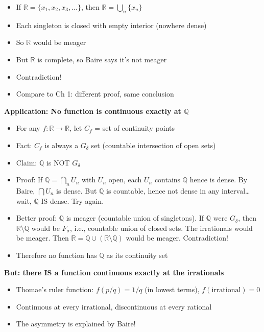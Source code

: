 \documentclass[
  10pt,
  letterpaper,
]{scrbook}
\providecommand{\tightlist}{%
  \setlength{\itemsep}{0pt}\setlength{\parskip}{0pt}}
\begin{document}
\begin{itemize}
\tightlist
\item
  If \(\mathbb{R} = \{x_1, x_2, x_3, \ldots\}\), then
  \(\mathbb{R} = \bigcup_n \{x_n\}\)
\item
  Each singleton is closed with empty interior (nowhere dense)
\item
  So \(\mathbb{R}\) would be meager
\item
  But \(\mathbb{R}\) is complete, so Baire says it's not meager
\item
  Contradiction!
\item
  Compare to Ch 1: different proof, same conclusion
\end{itemize}

\textbf{Application: No function is continuous exactly at
\(\mathbb{Q}\)}

\begin{itemize}
\tightlist
\item
  For any \(f: \mathbb{R} \to \mathbb{R}\), let \(C_f\) = set of
  continuity points
\item
  Fact: \(C_f\) is always a \(G_\delta\) set (countable intersection of
  open sets)
\item
  Claim: \(\mathbb{Q}\) is NOT \(G_\delta\)
\item
  Proof: If \(\mathbb{Q} = \bigcap_n U_n\) with \(U_n\) open, each
  \(U_n\) contains \(\mathbb{Q}\) hence is dense. By Baire,
  \(\bigcap U_n\) is dense. But \(\mathbb{Q}\) is countable, hence not
  dense in any interval\ldots{} wait, \(\mathbb{Q}\) IS dense. Try
  again.
\item
  Better proof: \(\mathbb{Q}\) is meager (countable union of
  singletons). If \(\mathbb{Q}\) were \(G_\delta\), then
  \(\mathbb{R} \setminus \mathbb{Q}\) would be \(F_\sigma\), i.e.,
  countable union of closed sets. The irrationals would be meager. Then
  \(\mathbb{R} = \mathbb{Q} \cup (\mathbb{R} \setminus \mathbb{Q})\)
  would be meager. Contradiction!
\item
  Therefore no function has \(\mathbb{Q}\) as its continuity set
\end{itemize}

\textbf{But: there IS a function continuous exactly at the irrationals}

\begin{itemize}
\tightlist
\item
  Thomae's ruler function: \(f(p/q) = 1/q\) (in lowest terms),
  \(f(\text{irrational}) = 0\)
\item
  Continuous at every irrational, discontinuous at every rational
\item
  The asymmetry is explained by Baire!
\end{itemize}
\end{document}
